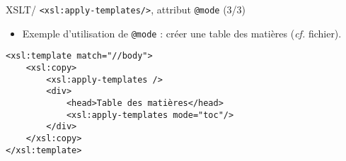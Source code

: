 \documentclass{beamer}
\begin{document}
    \begin{frame}[fragile]{XSLT/ \texttt{<xsl:apply-templates/>}, attribut \texttt{@mode} (3/3)}
        \Large
        \begin{itemize}
            \item Exemple d'utilisation de \texttt{@mode} : créer une table des matières (\textit{cf.} fichier).
        \end{itemize}
        \normalsize
        \begin{verbatim}
<xsl:template match="//body">
    <xsl:copy>
        <xsl:apply-templates />
        <div>
            <head>Table des matières</head>
            <xsl:apply-templates mode="toc"/>
        </div>
    </xsl:copy>
</xsl:template>
        \end{verbatim}
    \end{frame}
\end{document}
